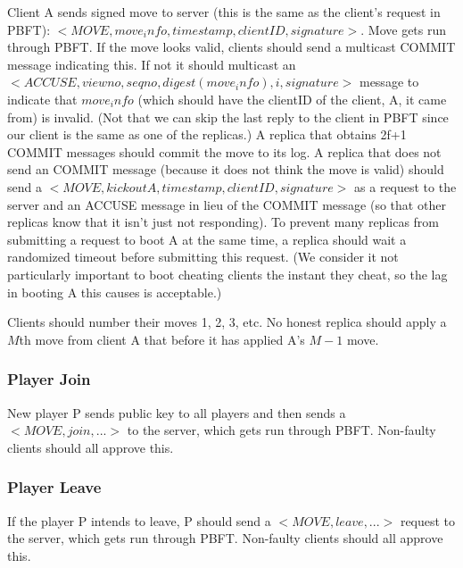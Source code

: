 \documentclass[12pt]{article}
\begin{document}
Client A sends signed move to server (this is the same as the client’s request in PBFT): $<MOVE, move_info, timestamp, clientID, signature>$. Move gets run through PBFT. If the move looks valid, clients should send a multicast COMMIT message indicating this. If not it should multicast an $<ACCUSE, viewno, seqno, digest(move_info), i, signature>$ message to indicate that $move_info$ (which should have the clientID of the client, A, it came from) is invalid. (Not that we can skip the last reply to the client in PBFT since our client is the same as one of the replicas.) A replica that obtains 2f+1 COMMIT messages should commit the move to its log. A replica that does not send an COMMIT message (because it does not think the move is valid) should send a $<MOVE, kick out A, timestamp, clientID, signature>$ as a request to the server and an ACCUSE message in lieu of the COMMIT message (so that other replicas know that it isn’t just not responding). To prevent many replicas from submitting a request to boot A at the same time, a replica should wait a randomized timeout before submitting this request. (We consider it not particularly important to boot cheating clients the instant they cheat, so the lag in booting A this causes is acceptable.) 

Clients should number their moves 1, 2, 3, etc. No honest replica should apply a $M$th move from client A that before it has applied A’s $M-1$ move. 

\subsubsection{Player Join}

New player P sends public key to all players and then sends a $<MOVE, join, ...>$ to the server, which gets run through PBFT. Non-faulty clients should all approve this.

\subsubsection{Player Leave}

If the player P intends to leave, P should send a $<MOVE, leave,...>$ request to the server, which gets run through PBFT. Non-faulty clients should all approve this.
\end{document}
